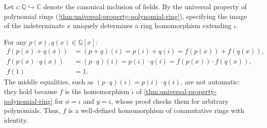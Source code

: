 \begin{content}
Let $\iota \colon \mathbb{Q} \hookrightarrow \mathbb{C}$ denote the canonical inclusion of fields. By the universal property of polynomial rings (\cref{thm:universal-property-polynomial-ring}), specifying the image of the indeterminate $x$ uniquely determines a ring homomorphism extending $\iota$.

\begin{center}
\end{center}


\begin{steps}
For any $p(x), q(x) \in \mathbb{Q}[x]$:
\begin{align*}
f(p(x) + q(x)) &= (p + q)(i) = p(i) + q(i) = f(p(x)) + f(q(x)), \\
f(p(x) \cdot q(x)) &= (p \cdot q)(i) = p(i) \cdot q(i) = f(p(x)) \cdot f(q(x)), \\
f(1) &= 1.
\end{align*}
The middle equalities, such as $(p \cdot q)(i) = p(i) \cdot q(i)$, are not automatic: they hold because $f$ is the homomorphism $\hat{\iota}$ of \cref{thm:universal-property-polynomial-ring} for $\phi = \iota$ and $y = i$, whose proof checks them for arbitrary polynomials. Thus, $f$ is a well-defined homomorphism of commutative rings with identity.
\end{steps}
\end{content}

